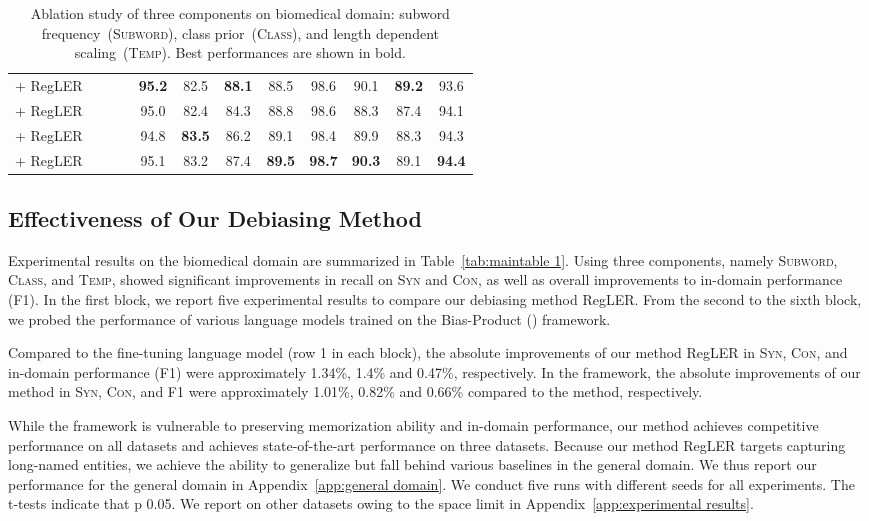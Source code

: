\documentclass[11pt]{article}
\newcommand{\cmark}{\ding{51}}\newcommand{\xmark}{\ding{55}}\newcommand{\cross}{\ding{61}}\newcommand{\mb}[1]{\textcolor{red}{#1}}
\begin{document}
\begin{table*}[t]
\begin{adjustbox}{width=.9\textwidth}
\begin{tabular}{ l c c c c c c c | c c c c }
 + RegLER & \cmark & \cmark & \xmark & \textbf{95.2} & 82.5 & \textbf{88.1} & 88.5 & 98.6 & 90.1 & \textbf{89.2} & 93.6 \\ 
 + RegLER & \cmark & \xmark & \cmark & 95.0 & 82.4 & 84.3 & 88.8 & 98.6 & 88.3 & 87.4 & 94.1 \\ 
 + RegLER & \xmark & \cmark & \cmark & 94.8 & \textbf{83.5} & 86.2 & 89.1 & 98.4 & 89.9 & 88.3 &  94.3 \\
 + RegLER & \cmark & \cmark & \cmark & 95.1 & 83.2 & 87.4 & \textbf{89.5} & \textbf{98.7} & \textbf{90.3} & 89.1 & \textbf{94.4} \\
\bottomrule
\end{tabular}
\end{adjustbox}
\caption{Ablation study of three components on biomedical domain: subword frequency~(\textsc{Subword}), class prior~(\textsc{Class}), and length dependent scaling~(\textsc{Temp}). Best performances are shown in bold.}
\label{tab:ablation table 1}
\end{table*}


\subsection{Effectiveness of Our Debiasing Method}
Experimental results on the biomedical domain are summarized in Table~\ref{tab:maintable 1}.
Using three components, namely \textsc{Subword}, \textsc{Class}, and \textsc{Temp}, showed significant improvements in recall on \textsc{Syn} and \textsc{Con}, as well as overall improvements to in-domain performance (F1).
In the first block, we report five experimental results to compare our debiasing method RegLER.
From the second to the sixth block, we probed the performance of various language models trained on the Bias-Product () framework.

Compared to the fine-tuning language model (row 1 in each block), the absolute improvements of our method RegLER in \textsc{Syn}, \textsc{Con}, and in-domain performance (F1) were approximately 1.34\%, 1.4\% and 0.47\%, respectively.
In the  framework, the absolute improvements of our method in \textsc{Syn}, \textsc{Con}, and F1 were approximately 1.01\%, 0.82\% and 0.66\% compared to the \cite{kim2021your} method, respectively.

While the  framework is vulnerable to preserving memorization ability and in-domain performance, our method achieves competitive performance on all datasets and achieves state-of-the-art performance on three datasets.
Because our method RegLER targets capturing long-named entities, we achieve the ability to generalize but fall behind various baselines in the general domain.
We thus report our performance for the general domain in Appendix~\ref{app:general domain}.
We conduct five runs with different seeds for all experiments.
The t-tests indicate that p  0.05.
We report on other datasets owing to the space limit in Appendix~\ref{app:experimental results}.
\end{document}
